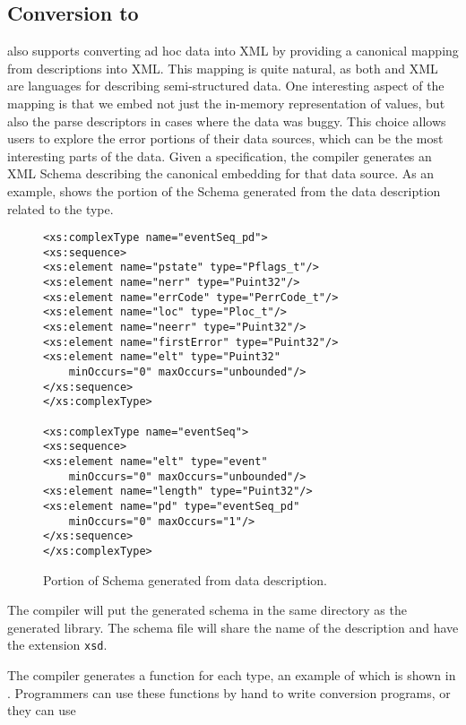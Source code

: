 \subsection{Conversion to \xml{}}
\pads{} also supports converting ad hoc data into XML by providing a canonical mapping from \pads{} descriptions into XML.  This mapping is quite natural, as both \pads{} and XML are languages for describing semi-structured data.
One interesting aspect of the mapping is that we embed not just the in-memory representation of \pads{} values, but also the parse descriptors in cases where the data was buggy.  This choice allows users to explore the error portions
of their data sources, which can be the most interesting parts of the data.
Given a \pads{} specification, the \pads{} compiler generates an XML Schema describing the canonical embedding for that data source.  
As an example, 
 shows 
the portion of the \xml{} Schema generated from the \dibbler{} data description
related to the 
 type.

\begin{figure*}
\begin{small}
\begin{verbatim}
<xs:complexType name="eventSeq_pd">
<xs:sequence>
<xs:element name="pstate" type="Pflags_t"/>
<xs:element name="nerr" type="Puint32"/>
<xs:element name="errCode" type="PerrCode_t"/>
<xs:element name="loc" type="Ploc_t"/>
<xs:element name="neerr" type="Puint32"/>
<xs:element name="firstError" type="Puint32"/>
<xs:element name="elt" type="Puint32" 
    minOccurs="0" maxOccurs="unbounded"/>
</xs:sequence>
</xs:complexType>

<xs:complexType name="eventSeq">
<xs:sequence>
<xs:element name="elt" type="event" 
    minOccurs="0" maxOccurs="unbounded"/>
<xs:element name="length" type="Puint32"/>
<xs:element name="pd" type="eventSeq_pd" 
    minOccurs="0" maxOccurs="1"/>
</xs:sequence>
</xs:complexType>
\end{verbatim} 
\end{small}
\caption{Portion of \xml{} Schema generated from \dibbler{} data description.}
\label{figure:sirius-xsd}
\end{figure*}
The \pads{} compiler will put the generated schema in the same directory as the generated library.  The schema file will share the name of the \pads{} description and have the extension \texttt{xsd}.


The \pads{} compiler generates a  function for each type, an example of which is shown in .  Programmers can use these functions by hand to write conversion programs, or they can use 


